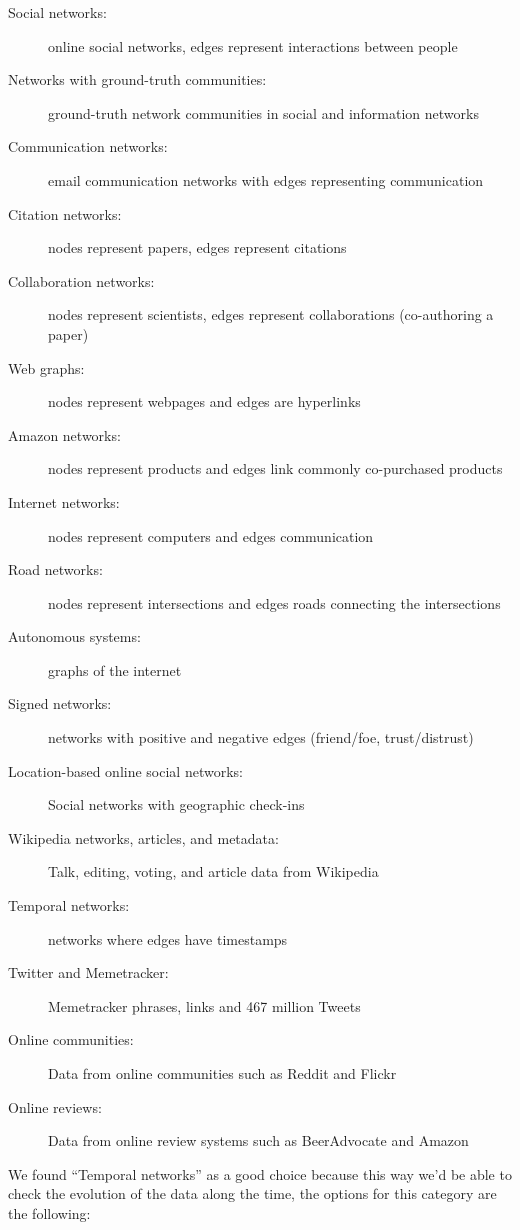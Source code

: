 \documentclass{article}
\begin{document}
  \begin{description}
    \item[Social networks:] online social networks, edges represent interactions between people
    \item[Networks with ground-truth communities:] ground-truth network communities in social and information networks
    \item[Communication networks:] email communication networks with edges representing communication
    \item[Citation networks:] nodes represent papers, edges represent citations
    \item[Collaboration networks:] nodes represent scientists, edges represent collaborations (co-authoring a paper)
    \item[Web graphs:] nodes represent webpages and edges are hyperlinks
    \item[Amazon networks:] nodes represent products and edges link commonly co-purchased products
    \item[Internet networks:] nodes represent computers and edges communication
    \item[Road networks:] nodes represent intersections and edges roads connecting the intersections
    \item[Autonomous systems:] graphs of the internet
    \item[Signed networks:] networks with positive and negative edges (friend/foe, trust/distrust)
    \item[Location-based online social networks:] Social networks with geographic check-ins
    \item[Wikipedia networks, articles, and metadata:] Talk, editing, voting, and article data from Wikipedia
    \item[Temporal networks:] networks where edges have timestamps
    \item[Twitter and Memetracker:] Memetracker phrases, links and 467 million Tweets
    \item[Online communities:] Data from online communities such as Reddit and Flickr
    \item[Online reviews:] Data from online review systems such as BeerAdvocate and Amazon
  \end{description}

  We found ``Temporal networks'' as a good choice because this way we'd be able to check the evolution of the data along the time, the options for this category are the following:
\end{document}
